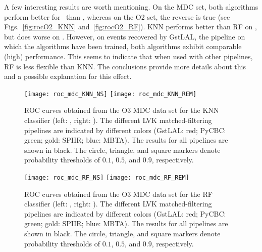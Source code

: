 A few interesting results are worth mentioning.  On the \ac{MDC} set, both algorithms perform better for \hasns\ than \hasrem, whereas on the \ac{O2} set, the reverse is true (see Figs.~\ref{fig:rocO2_KNN} and~\ref{fig:rocO2_RF}). \ac{KNN} performs better than \ac{RF} on \hasrem, but does worse on \hasns. However, on events recovered by GstLAL, the pipeline on which the algorithms have been trained, both algorithms exhibit comparable (high) performance. This seems to indicate that when used with other pipelines, \ac{RF} is less flexible than \ac{KNN}. The conclusions provide more details about this and a possible explanation for this effect.
 

\begin{figure}%
\texttt{[image: roc\_mdc\_KNN\_NS]}
\texttt{[image: roc\_mdc\_KNN\_REM]}
\caption{\ac{ROC} curves obtained from the \ac{O3} \ac{MDC} data set for the \ac{KNN} classifier (left: \hasns, right: \hasrem). The different \ac{LVK} matched-filtering pipelines are indicated by different colors (GstLAL: red; PyCBC: green; gold: SPIIR; blue: MBTA). The results for all pipelines are shown in black. The circle, triangle, and square markers denote probability thresholds of $0.1$, $0.5$, and $0.9$, respectively.}
\label{fig:rocMDC_KNN}
\end{figure}


\begin{figure}%
\texttt{[image: roc\_mdc\_RF\_NS]}
\texttt{[image: roc\_mdc\_RF\_REM]}
\caption{\ac{ROC} curves obtained from the \ac{O3} \ac{MDC} data set for the \ac{RF} classifier (left: \hasns, right: \hasrem). The different \ac{LVK} matched-filtering pipelines are indicated by different colors (GstLAL: red; PyCBC: green; gold: SPIIR; blue: MBTA). The results for all pipelines are shown in black. The circle, triangle, and square markers denote probability thresholds of $0.1$, $0.5$, and $0.9$, respectively.}
\label{fig:rocMDC_RF}
\end{figure}

